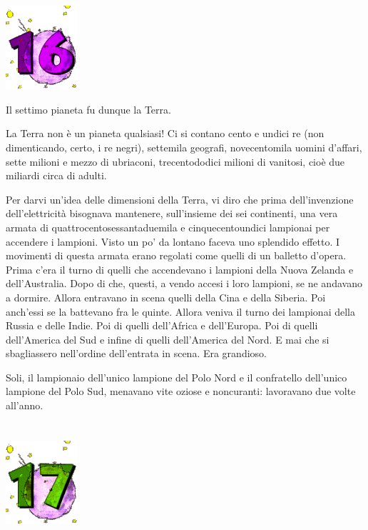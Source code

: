 \documentclass[11pt]{scrbook}
\begin{document}
\chapter{}
\begin{center}
\includegraphics{img/chapter16}
\end{center}

Il settimo pianeta fu dunque la Terra.

La Terra non è un pianeta qualsiasi! Ci si contano cento e undici re (non dimenticando, certo, i re negri), settemila geografi, novecentomila uomini d'affari, sette milioni e mezzo di ubriaconi, trecentododici milioni di vanitosi, cioè due miliardi circa di adulti.

Per darvi un'idea delle dimensioni della Terra, vi diro che prima dell'invenzione dell'elettricità bisognava mantenere, sull'insieme dei sei continenti, una vera armata di quattrocentosessantaduemila e cinquecentoundici lampionai per accendere i lampioni. Visto un po' da lontano faceva uno splendido effetto. I movimenti di questa armata erano regolati come quelli di un balletto d'opera. Prima c'era il turno di quelli che accendevano i lampioni della Nuova Zelanda e dell'Australia. Dopo di che, questi, a vendo accesi i loro lampioni, se ne andavano a dormire. Allora entravano in scena quelli della Cina e della Siberia. Poi anch'essi se la battevano fra le quinte. Allora veniva il turno dei lampionai della Russia e delle Indie. Poi di quelli dell'Africa e dell'Europa. Poi di quelli dell'America del Sud e infine di quelli dell'America del Nord. E mai che si sbagliassero nell'ordine dell'entrata in scena. Era grandioso.

Soli, il lampionaio dell'unico lampione del Polo Nord e il confratello dell'unico lampione del Polo Sud, menavano vite oziose e noncuranti: lavoravano due volte all'anno.

\chapter{}
\begin{center}
\includegraphics{img/chapter17}
\end{center}
\end{document}

